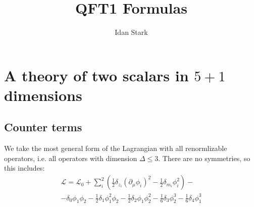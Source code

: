 \documentclass{article}
\title{QFT1 Formulas}
\author{Idan Stark}
\begin{document}
\maketitle

\section{A theory of two scalars in $5+1$ dimensions}
\subsection{Counter terms}
We take the most general form of the Lagrangian with all renormlizable operators, i.e. all operators with dimension $\Delta \le 3$. There are no symmetries, so this includes:
\begin{equation}
\begin{gathered}
    \mathcal{L} = \mathcal{L}_0 + \sum_i^2 \left(\frac{1}{2}\delta_{z_i}\left(\partial_\mu \phi_i\right)^2 - \frac{1}{2}\delta_{m_i}\phi_i^2\right) - \\ - \delta_0\phi_1\phi_2 - \frac{1}{2}\delta_1\phi_1^2\phi_2 - \frac{1}{2}\delta_2\phi_1\phi_2^2 - \frac{1}{6}\delta_3\phi_2^3 - \frac{1}{6}\delta_4\phi_1^3
\end{gathered}
\end{equation}
\end{document}
